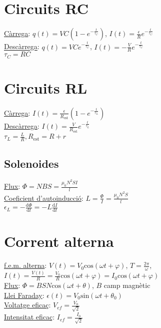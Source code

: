 \documentclass[12pt]{article}
\begin{document}
\begin{multicols}{5}
\section{Circuits RC}

\underline{Càrrega}: $q(t) = VC\left( 1 - e^{-\frac{t}{\tau_C}}\right)$, $I(t) = \frac{\epsilon}{R} e^{-\frac{t}{\tau_C}}$ \\
\underline{Descàrrega}: $q(t) = VCe^{-\frac{t}{\tau_C}}$, $I(t) = -\frac{V}{R}e^{-\frac{t}{\tau_C}}$ \\

$\tau_C = RC$

\section{Circuits RL}
\underline{Càrrega}: $I(t) = \frac{\epsilon}{R_{\text{est}}} \left(1 - e^{-\frac{t}{\tau_L}}\right)$ \\
\underline{Descàrrega}: $I(t) = \frac{V}{R_{\text{est}}}e^{-\frac{t}{\tau_L}}$ \\
$\tau_L = \frac{L}{R}, R_{\text{est}} = R + r$

\subsection{Solenoides}

\underline{Flux}: $\Phi = NBS = \frac{\mu_0 N^2SI}{l}$ \\
\underline{Coeficient d'autoinducció}: $L = \frac{\Phi}{I} = \frac{\mu_0N^2S}{l}$ \\
$\epsilon_L= -\frac{\text{d}\Phi}{\text{d}t} = -L \frac{\text{d}I}{\text{d}t}$

\section{Corrent alterna}
\underline{f.e.m. alterna}: $V(t) = V_0\text{cos}(\omega t+\varphi)$, $T = \frac{2\pi}{\omega}$, $I(t) = \frac{V(t)}{R} = \frac{V_0}{R}\text{cos}(\omega t + \varphi) = I_0\text{cos}(\omega t + \varphi)$ \\
\underline{Flux}: $\Phi = BSN\text{cos}(\omega t+\theta)$, $B$ camp magnètic \\
\underline{Llei Faraday}: $\epsilon(t) = V_0\text{sin}(\omega t + \theta_0)$ \\
\underline{Voltatge eficaç}: $V_{ef} = \frac{V_0}{\sqrt{2}}$ \\
\underline{Intensitat eficaç}: $I_{ef} = \frac{I_0}{\sqrt{2}}$


\end{multicols}
\end{document}
